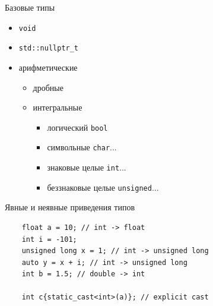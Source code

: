 \documentclass[unknownkeysallowed,xcolor=table]{beamer}
\begin{document}
\begin{frame}{Базовые типы}
  \begin{itemize}
    \item \lstinline{void} \vspace{0.5em}
    \item \lstinline{std::nullptr_t} \vspace{0.5em}
    \item арифметические \vspace{0.5em}
      \begin{itemize}
        \item дробные \vspace{0.5em}
        \item интегральные \vspace{0.5em}
          \begin{itemize}
            \item логический \lstinline{bool} \vspace{0.5em}
            \item символьные \lstinline{char}... \vspace{0.5em}
            \item знаковые целые \lstinline{int}... \vspace{0.5em}
            \item беззнаковые целые \lstinline{unsigned}... \vspace{0.5em}
          \end{itemize}
      \end{itemize}
  \end{itemize}
\end{frame}

\begin{frame}[fragile]{Явные и неявные приведения типов}
  \begin{lstlisting}
    float a = 10; // int -> float
    int i = -101;
    unsigned long x = 1; // int -> unsigned long
    auto y = x + i; // int -> unsigned long
    int b = 1.5; // double -> int

    int c{static_cast<int>(a)}; // explicit cast
  \end{lstlisting}
\end{frame}
\end{document}
